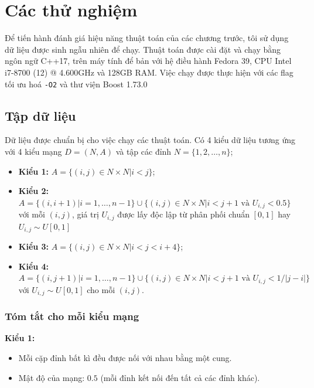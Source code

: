 \documentclass[../main.tex]{subfiles}
\begin{document}
\chapter{Các thử nghiệm}\label{cuxe1c-thux1eed-nghiux1ec7m}

Để tiến hành đánh giá hiệu năng thuật toán của các chương trước, tôi sử
dụng dữ liệu được sinh ngẫu nhiên để chạy. Thuật toán được cài đặt và
chạy bằng ngôn ngữ C++17, trên máy tính để bản với hệ điều hành Fedora
39, CPU Intel i7-8700 (12) @ 4.600GHz và 128GB RAM. Việc chạy được thực hiện
với các flag tối ưu hoá \texttt{-O2} và thư viện Boost 1.73.0



\section{Tập dữ liệu}\label{tux1eadp-dux1eef-liux1ec7u}

Dữ liệu được chuẩn bị cho việc chạy các thuật toán. Có 4 kiểu dữ liệu
tương ứng với 4 kiểu mạng \(D=(N,A)\) và tập các đỉnh
\(N =\{1,2,\dots, n\}\);

\begin{itemize}
\tightlist
\item
  \textbf{Kiểu 1:} \(A = \{(i, j) \in N \times N | i < j \}\);
\item
  \textbf{Kiểu 2:}
  \(A = \{(i, i+1) | i = 1, \dots, n-1\} \cup \{(i, j) \in N \times N | i < j + 1 \text{ và } U_{i, j} < 0.5\}\)
  với mỗi \((i, j)\), giá trị \(U_{i, j}\) được lấy độc lập từ phân phối
  chuẩn \([0, 1]\) hay \(U_{i, j} \sim U[0,1]\)
\item
  \textbf{Kiểu 3:} \(A = \{(i, j) \in N \times N | i < j < i + 4 \}\);
\item
  \textbf{Kiểu 4:}
  \(A = \{(i, j+1) | i = 1, \dots, n-1\} \cup \{(i, j) \in N \times N | i < j +1 \text{ và } U_{i, j} < 1/ |j-i|\}\)
  với \(U_{i, j} \sim U[0,1]\) cho mỗi \((i, j)\).
\end{itemize}

\subsection{Tóm tắt cho mỗi kiểu mạng}\label{tom-tat-moi-kieu-mang}

\textbf{Kiểu 1:}

\begin{itemize}
\tightlist
\item
  Mỗi cặp đỉnh bất kì đều được nối với nhau bằng một cung.
\item
  Mật độ của mạng: \(0.5\) (mỗi đỉnh kết nối đến tất cả các đỉnh khác).
\end{itemize}
\end{document}
